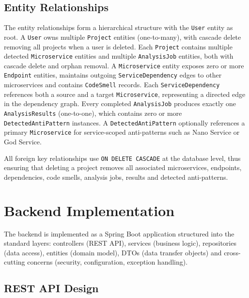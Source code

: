 \subsection{Entity Relationships}
\label{subsec:entity-relationships}

\par The entity relationships form a hierarchical structure with the \texttt{User} entity as root. A \texttt{User} owns multiple \texttt{Project} entities (one-to-many), with cascade delete removing all projects when a user is deleted. Each \texttt{Project} contains multiple detected \texttt{Microservice} entities and multiple \texttt{AnalysisJob} entities, both with cascade delete and orphan removal. A \texttt{Microservice} entity exposes zero or more \texttt{Endpoint} entities, maintains outgoing \texttt{ServiceDependency} edges to other microservices and contains \texttt{CodeSmell} records. Each \texttt{ServiceDependency} references both a source and a target \texttt{Microservice}, representing a directed edge in the dependency graph. Every completed \texttt{AnalysisJob} produces exactly one \texttt{A\-nal\-y\-sisResults} (one-to-one), which contains zero or more \texttt{DetectedAntiPattern} instances. A \texttt{DetectedAntiPattern} optionally references a primary \texttt{Micro\-service} for service-scoped anti-patterns such as Nano Service or God Service.

All foreign key relationships use \texttt{ON DELETE CASCADE} at the database level, thus ensuring that deleting a project removes all associated microservices, endpoints, dependencies, code smells, analysis jobs, results and detected anti-patterns.


\section{Backend Implementation}
\label{sec:backend-impl}

\par The backend is implemented as a Spring Boot application structured into the standard layers: controllers (REST API), services (business logic), repositories (data access), entities (domain model), DTOs (data transfer objects) and cross-cutting concerns (security, configuration, exception handling).

\subsection{REST API Design}
\label{subsec:rest-api}

